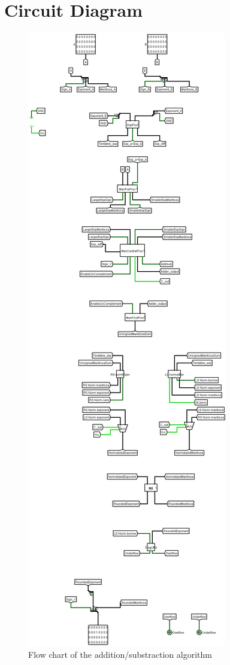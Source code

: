 \documentclass[18pt]{article}
\begin{document}
\section{Circuit Diagram}
\begin{figure}[!h]
    \centering
    \captionsetup{font=Large}
    \includegraphics[scale=0.2]{Util/FPA.png}
    \caption{Flow chart of the addition/substraction algorithm}
\end{figure}
\newpage
\end{document}
